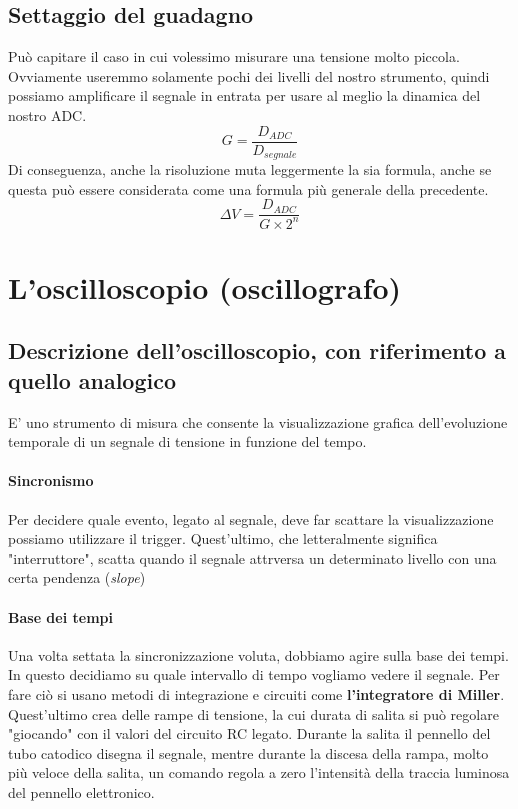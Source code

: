 \documentclass{article}
\begin{document}
	\subsection*{Settaggio del guadagno}
	Può capitare il caso in cui volessimo misurare una tensione molto piccola. Ovviamente useremmo solamente pochi dei livelli del nostro strumento, quindi possiamo amplificare il segnale in entrata per usare al meglio la dinamica del nostro ADC.
	\begin{equation}
		G = \frac{D_{ADC}}{D_{segnale}}
	\end{equation}
	Di conseguenza, anche la risoluzione muta leggermente la sia formula, anche se questa può essere considerata come una formula più generale della precedente.
	\begin{equation}
		\Delta V = \frac{D_{ADC}}{G \times 2^n}
	\end{equation}
	
	\newpage
	\section*{L'oscilloscopio (oscillografo)}
	\subsection*{Descrizione dell'oscilloscopio, con riferimento a quello analogico}
	E' uno strumento di misura che consente la visualizzazione grafica dell'evoluzione temporale di un segnale di tensione in funzione del tempo.
	\paragraph*{Sincronismo}
	Per decidere quale evento, legato al segnale, deve far scattare la visualizzazione possiamo utilizzare il trigger. Quest'ultimo, che letteralmente significa "interruttore", scatta quando il segnale attrversa un determinato livello con una certa pendenza (\textit{slope})
	\paragraph*{Base dei tempi}
	Una volta settata la sincronizzazione voluta, dobbiamo agire sulla base dei tempi. In questo decidiamo su quale intervallo di tempo vogliamo vedere il segnale. Per fare ciò si usano metodi di integrazione e circuiti come \textbf{l'integratore di Miller}. Quest'ultimo crea delle rampe di tensione, la cui durata di salita si può regolare "giocando" con il valori del circuito RC legato. Durante la salita il pennello del tubo catodico disegna il segnale, mentre durante la discesa della rampa, molto più veloce della salita, un comando regola a zero l'intensità della traccia luminosa del pennello elettronico.
\end{document}
